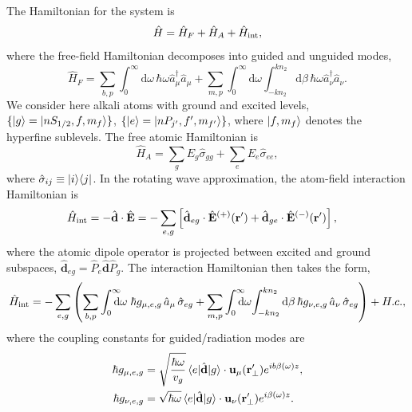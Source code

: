 \documentclass[preprint, aps,pra,onecolumn]{revtex4-1} %
\newcommand{\inter}{{\rm int}}
\begin{document}
The Hamiltonian for the system is
\begin{equation}
\hat{H} = \hat{H}_F+\hat{H}_A + \hat{H}_{\inter},
\end{equation}
where the free-field Hamiltonian decomposes into guided and unguided modes, 
	\begin{equation}
		\hat{H}_F = \sum_{b,p}\int_0^{\infty}\!\!\!\!\! \mathrm{d}\omega \, \hbar \omega \hat{a}^\dagger_\mu \hat{a}_\mu 
+\sum_{m,p} \int_0^{\infty}\!\!\!\!\! \mathrm{d}\omega  \int_{-k n_2}^{k n_2} \mathrm{d}\beta \, \hbar \omega 
\hat{a}^\dagger_\nu \hat{a}_\nu.
	\end{equation}
We consider here alkali atoms with ground and excited levels, $\{ \lvert{g}\rangle=\lvert{nS_{1/2}, f, m_f}\rangle\}$, $\{ \lvert{e}\rangle =\lvert{nP_{j'}, f', m_{f'}}\rangle\}$, where $\lvert{f, m_f}\rangle$ denotes the hyperfine sublevels.  The free atomic Hamiltonian is
	\begin{equation}
		\hat{H}_A  = \sum_g E_g \hat{\sigma}_{gg} + \sum_e E_e \hat{\sigma}_{ee},
	\end{equation}
where $\hat{\sigma}_{ij} \equiv \lvert{i}\rangle\langle{j}\rvert$.  In the rotating wave approximation, the atom-field interaction Hamiltonian is
	\begin{align}
		\hat{H}_{\inter} &= -\hat{\mathbf{d}}\cdot \hat{\mathbf{E}} =- \sum_{e,g} \left[ \hat{\mathbf{d}}_{eg}\cdot 
\hat{\mathbf{E}}^{(+)}(\br')+\hat{\mathbf{d}}_{ge}\cdot \hat{\mathbf{E}}^{(-)}(\br') \right],
	\end{align}
where the atomic dipole operator is projected between excited and ground subspaces, $\hat{\mathbf{d}}_{eg}= \hat{P}_e \hat{\mathbf{d}} \hat{P}_g $. The interaction Hamiltonian then takes the form, 
\begin{equation}
	\hat{H}_{\inter} = -\sum_{e,g} \left(\sum_{b,p} \int_0^{\infty}\!\!\!\!\!\mathrm{d}\omega \; \hbar g_{\mu, e,g}\, \hat{a}_\mu  \, 
		\hat{\sigma}_{eg}+ \sum_{m,p} \int_0^{\infty}\!\!\!\!\!\mathrm{d}\omega \! \int_{-kn_2}^{kn_2}\mathrm{d}\beta \,  \hbar 
g_{\nu, e,g}\, \hat{a}_\nu \, \hat{\sigma}_{eg}\right) + {H.c.},
	\end{equation}
where the coupling constants for guided/radiation modes are
\begin{subequations} \label{Eq::CouplingConstants}
	\begin{align}
		\hbar g_{\mu, e,g} &= \sqrt{\frac{\hbar \omega}{ v_g  }}\, \langle{e}\rvert \hat{\mathbf{d}} \lvert{g}\rangle 
\cdot\mathbf{u}_\mu ( \mathbf{r}'_\perp ) e^{i b \beta(\omega)z} , \\
		\hbar g_{\nu, e,g} &= \sqrt{  \hbar \omega } \, \langle{e}\rvert \hat{\mathbf{d}} \lvert{g}\rangle \cdot \mathbf{u}_\nu ( \mathbf{r}'_\perp) e^{i\beta(\omega)z}  .
	\end{align}
\end{subequations}
\end{document}
